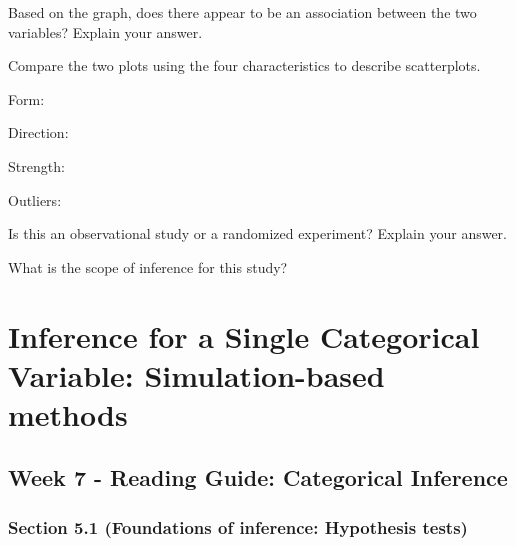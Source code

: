 \documentclass[
]{report}
\newcommand{\rgi}{\hspace{24pt}}  %
\begin{document}
\rgi Based on the graph, does there appear to be an association between the two variables? Explain your answer.

\vspace{0.5in}

\rgi Compare the two plots using the four characteristics to describe scatterplots.

\rgi \rgi Form:

\vspace{0.2in}

\rgi \rgi Direction:

\vspace{0.2in}

\rgi \rgi Strength:

\vspace{0.2in}

\rgi \rgi Outliers:

\vspace{0.2in}

\rgi Is this an observational study or a randomized experiment? Explain your answer.

\vspace{0.5in}

\rgi What is the scope of inference for this study?

\newpage

\hypertarget{inference-for-a-single-categorical-variable-simulation-based-methods}{%
\chapter{Inference for a Single Categorical Variable: Simulation-based methods}\label{inference-for-a-single-categorical-variable-simulation-based-methods}}

\hypertarget{week-7---reading-guide-categorical-inference}{%
\section{Week 7 - Reading Guide: Categorical Inference}\label{week-7---reading-guide-categorical-inference}}

\hypertarget{section-5.1-foundations-of-inference-hypothesis-tests}{%
\subsection*{Section 5.1 (Foundations of inference: Hypothesis tests)}\label{section-5.1-foundations-of-inference-hypothesis-tests}}
\end{document}
